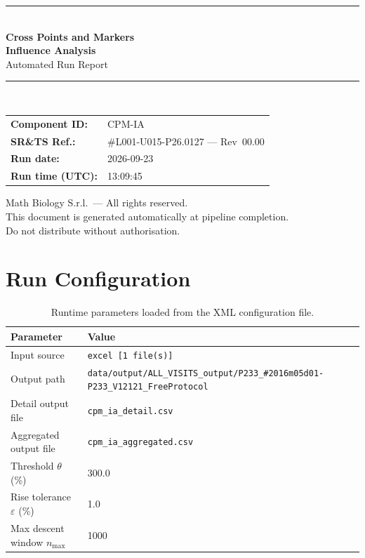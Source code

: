 \documentclass[a4paper,11pt]{article}
\begin{document}
\begin{titlepage}
\begin{center}
  \vspace*{1.8cm}
  {\color{dmaaccent}\rule{\linewidth}{1.5pt}}\\[0.6cm]
  {\LARGE\bfseries\color{dmaaccent}
    Cross Points and Markers\\[0.25cm]
    Influence Analysis}\\[0.4cm]
  {\Large Automated Run Report}\\[0.3cm]
  {\color{dmaaccent}\rule{\linewidth}{1.5pt}}\\[2cm]

  \begin{tabular}{ll}
    \textbf{Component ID:}   & CPM-IA \\[0.3cm]
    \textbf{SR\&TS Ref.:}    & \#L001-U015-P26.0127 --- Rev~00.00 \\[0.3cm]
    \textbf{Run date:}       & 2026-09-23 \\[0.3cm]
    \textbf{Run time (UTC):} & 13:09:45 \\
  \end{tabular}

  \vfill
  {\color{dmagray}\small
    Math Biology S.r.l.\ --- All rights reserved.\\
    This document is generated automatically at pipeline completion.\\
    Do not distribute without authorisation.}
\end{center}
\end{titlepage}

\tableofcontents
\clearpage

\section{Run Configuration}

\begin{table}[h!]
\centering
\small
\caption{Runtime parameters loaded from the XML configuration file.}
\begin{tabular}{ll}
\toprule
\textbf{Parameter} & \textbf{Value} \\
\midrule
Input source                      & \texttt{excel [1 file(s)]} \\
Output path                       & \texttt{data/output/ALL\_VISITS\_output/P233\_\#2016m05d01-P233\_V12121\_FreeProtocol} \\
Detail output file                & \texttt{cpm\_ia\_detail.csv} \\
Aggregated output file            & \texttt{cpm\_ia\_aggregated.csv} \\
Threshold $\theta$ (\%)           & 300.0 \\
Rise tolerance $\varepsilon$ (\%) & 1.0 \\
Max descent window $n_{\max}$     & 1000 \\
\bottomrule
\end{tabular}
\end{table}
\end{document}
